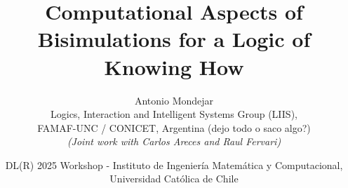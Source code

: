 \documentclass{beamer}
\begin{document}


 
\title[Computational Aspects of Bisimulations for a Logic of Knowing How]{Computational Aspects of Bisimulations for a Logic of Knowing How}%
\author[Antonio Mondejar]
		{{\small Antonio Mondejar}  \\ {\tiny Logics, Interaction and Intelligent Systems Group (LIIS), \\  FAMAF-UNC / CONICET, Argentina (dejo todo o saco algo?)}
        \\
        {\tiny \emph{(Joint work with Carlos Areces and Raul Fervari)}} \\
        \bigskip
}

\date[DL(R) 2025 Workshop]
{ \tiny{DL(R) 2025 Workshop - Instituto de Ingeniería Matemática y Computacional, 
        Universidad Católica de Chile}}


\begin{frame}
\titlepage
\end{frame}


\end{document}
